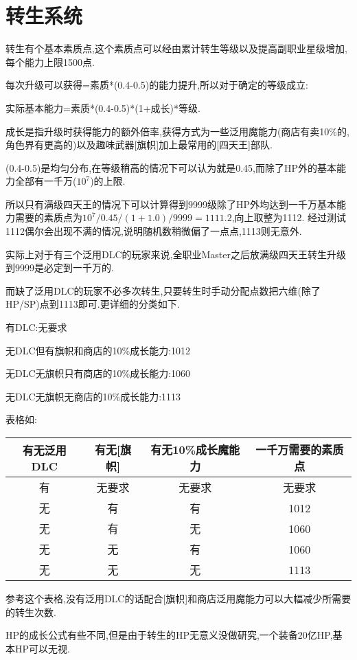 
\newpage

\section{转生系统}

转生有个基本素质点,这个素质点可以经由累计转生等级以及提高副职业星级增加,每个能力上限1500点.

每次升级可以获得=素质*(0.4-0.5)的能力提升,所以对于确定的等级成立:

实际基本能力=素质*(0.4-0.5)*(1+成长)*等级.

成长是指升级时获得能力的额外倍率,获得方式为一些泛用魔能力(商店有卖10\%的,角色界有更高的)以及趣味武器[旗帜]加上最常用的[四天王]部队.

(0.4-0.5)是均匀分布,在等级稍高的情况下可以认为就是0.45,而除了HP外的基本能力全部有一千万($10^7$)的上限.

所以只有满级四天王的情况下可以计算得到9999级除了HP外均达到一千万基本能力需要的素质点为$10^7/0.45/(1+1.0)/9999=1111.2$,向上取整为1112.
经过测试1112偶尔会出现不满的情况,说明随机数稍微偏了一点点,1113则无意外.

实际上对于有三个泛用DLC的玩家来说,全职业Master之后放满级四天王转生升级到9999是必定到一千万的.

而缺了泛用DLC的玩家不必多次转生,只要转生时手动分配点数把六维(除了HP/SP)点到1113即可.更详细的分类如下.

有DLC:无要求

无DLC但有旗帜和商店的10\%成长能力:1012

无DLC无旗帜只有商店的10\%成长能力:1060

无DLC无旗帜无商店的10\%成长能力:1113

表格如:

\begin{center}
	\begin{tabular}
	{| c | c | c | c |}
	\hline
	有无泛用DLC & 有无[旗帜] & 有无10\%成长魔能力 & 一千万需要的素质点\\
	\hline
	有 & 无要求 & 无要求 & 无要求\\
	\hline
	无 & 有 & 有 & 1012\\
	\hline
	无 & 有 & 无 & 1060\\
	\hline
	无 & 无 & 有 & 1060\\
	\hline
	无 & 无 & 无 & 1113\\
	\hline
	\end{tabular}
\end{center}

参考这个表格,没有泛用DLC的话配合[旗帜]和商店泛用魔能力可以大幅减少所需要的转生次数.

HP的成长公式有些不同,但是由于转生的HP无意义没做研究,一个装备20亿HP,基本HP可以无视.
